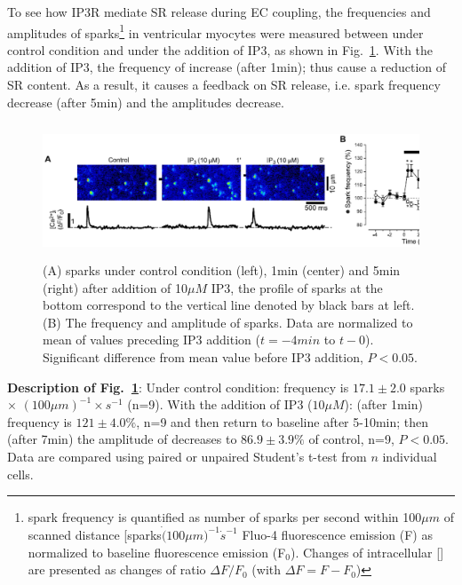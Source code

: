 To see how IP3R mediate SR  release during EC coupling, the
frequencies and amplitudes of 
sparks\footnote{ spark frequency is quantified as number of
  sparks per second within 100$\mu m$ of scanned distance [sparks$\dot
  (100\mu m)^{-1}\dot s^{-1}$
\break
Fluo-4 fluorescence emission (F) as normalized to baseline
fluorescence emission (F$_0$). Changes of intracellular []
are presented as changes of ratio $\Delta F/F_0$ (with $\Delta F = F-F_0$)}
in ventricular myocytes were measured between under control condition
and under the addition of IP3, as shown in
Fig.~\ref{fig:IP3_Ca_spark}. With the addition of IP3, the frequency
of  increase (after 1min); thus cause a reduction of SR
 content. As a result, it causes a feedback on SR 
release, i.e.  spark frequency decrease (after 5min) and the
amplitudes decrease.

\begin{figure}[hbt]
 \centerline{\includegraphics[height=4cm]{./images/IP3_Ca_spark.eps}}
 \caption{(A)  sparks under control condition (left), 1min
   (center) and 5min (right) after addition of 10$\mu M$ IP3, the
   profile of  sparks at the bottom correspond to the
   vertical line denoted by black bars at left. (B) The frequency and
   amplitude of  sparks. Data are normalized to mean of
   values preceding IP3 addition ($t=-4min$ to $t-0$). Significant
   difference from mean value before IP3 addition, $P<0.05$.}
\label{fig:IP3_Ca_spark}
\end{figure}


{\bf Description of Fig.~\ref{fig:IP3_Ca_spark}}: Under control
condition:  frequency is $17.1\pm 2.0$ sparks $\times$
$(100\mu m)^{-1}\times s^{-1}$ (n=9). With the addition of IP3 ($10\mu
M$): (after 1min) frequency is $121\pm 4.0\%$, n=9 and then return to
baseline after 5-10min; then (after 7min) the amplitude of 
decreases to $86.9\pm 3.9\%$ of control, n=9, $P<0.05$.
Data are compared using paired or unpaired Student's t-test from $n$
individual cells.



